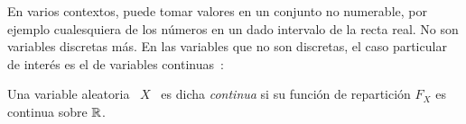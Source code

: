 



\label{sec:MP:VAContinua}

En  varios contextos,  puede  tomar valores  en  un conjunto  no numerable,  por
ejemplo cualesquiera de los n\'umeros en un dado intervalo de la recta real.  No
son variables  discretas m\'as. En las  variables que no son  discretas, el caso
particular de inter\'es es el de variables continuas~\cite{AthLah06, HogMck13}:
%
\begin{definicion}
  Una variable  aleatoria \  $X$ \ es  dicha {\it  continua} si su  funci\'on de
  repartici\'on  $F_X$ es  continua sobre  $\mathbb{R}$.
\end{definicion}

